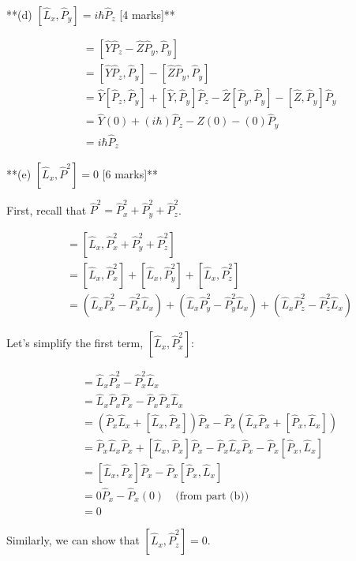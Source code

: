 \documentclass{article}
\begin{document}
**(d) $\left[\hat{L}_x, \hat{P}_y\right] = i\hbar \hat{P}_z$ [4 marks]**

\begin{align*}
[\hat{L}_x, \hat{P}_y] &= [\hat{Y}\hat{P}_z - \hat{Z}\hat{P}_y, \hat{P}_y] \\
&= [\hat{Y}\hat{P}_z, \hat{P}_y] - [\hat{Z}\hat{P}_y, \hat{P}_y] \\
&= \hat{Y}[\hat{P}_z, \hat{P}_y] + [\hat{Y}, \hat{P}_y]\hat{P}_z - \hat{Z}[\hat{P}_y, \hat{P}_y] - [\hat{Z}, \hat{P}_y]\hat{P}_y \\
&= \hat{Y}(0) + (i\hbar)\hat{P}_z - \hat{Z}(0) - (0)\hat{P}_y \\
&= i\hbar \hat{P}_z
\end{align*}

**(e) $\left[\hat{L}_x, \hat{P}^2\right] = 0$ [6 marks]**

First, recall that $\hat{P}^2 = \hat{P}_x^2 + \hat{P}_y^2 + \hat{P}_z^2$.

\begin{align*}
[\hat{L}_x, \hat{P}^2] &= [\hat{L}_x, \hat{P}_x^2 + \hat{P}_y^2 + \hat{P}_z^2] \\
&= [\hat{L}_x, \hat{P}_x^2] + [\hat{L}_x, \hat{P}_y^2] + [\hat{L}_x, \hat{P}_z^2] \\
&= (\hat{L}_x \hat{P}_x^2 - \hat{P}_x^2 \hat{L}_x) + (\hat{L}_x \hat{P}_y^2 - \hat{P}_y^2 \hat{L}_x) + (\hat{L}_x \hat{P}_z^2 - \hat{P}_z^2 \hat{L}_x)
\end{align*}

Let's simplify the first term, $[\hat{L}_x, \hat{P}_x^2]$:

\begin{align*}
[\hat{L}_x, \hat{P}_x^2] &= \hat{L}_x \hat{P}_x^2 - \hat{P}_x^2 \hat{L}_x \\
&= \hat{L}_x \hat{P}_x \hat{P}_x - \hat{P}_x \hat{P}_x \hat{L}_x \\
&= (\hat{P}_x \hat{L}_x + [\hat{L}_x, \hat{P}_x])\hat{P}_x - \hat{P}_x (\hat{L}_x \hat{P}_x + [\hat{P}_x, \hat{L}_x]) \\
&= \hat{P}_x \hat{L}_x \hat{P}_x + [\hat{L}_x, \hat{P}_x]\hat{P}_x - \hat{P}_x \hat{L}_x \hat{P}_x - \hat{P}_x[\hat{P}_x, \hat{L}_x] \\
&= [\hat{L}_x, \hat{P}_x]\hat{P}_x - \hat{P}_x[\hat{P}_x, \hat{L}_x] \\
&= 0\hat{P}_x - \hat{P}_x(0) \quad \text{(from part (b))}\\
&= 0
\end{align*}

Similarly, we can show that $[\hat{L}_x, \hat{P}_z^2] = 0$.
\end{document}
